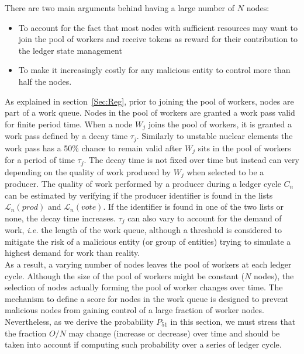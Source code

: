 There are two main arguments behind having a large number of $N$ nodes:

\begin{itemize}
 \item To account for the fact that most nodes with sufficient resources may want to join the pool of workers and receive tokens as reward for their contribution to the ledger state management
\item To make it increasingly costly for any malicious entity to control more than half the nodes.
\end{itemize}

As explained in section~\ref{Sec:Reg}, prior to joining the pool of workers, nodes are part of a work queue. Nodes in the pool of workers are granted a work pass valid for finite period time. When a node $W_j$ joins the pool of workers, it is granted a work pass defined by a decay time $\tau_j$. Similarly to unstable nuclear elements the work pass has a 50\% chance to remain valid after $W_j$ sits in the pool of workers for a period of time $\tau_j$. The decay time is not fixed over time but instead can very depending on the quality of work produced by $W_j$ when selected to be a producer. The quality of work performed by a producer during a ledger cycle $C_n$ can be estimated by verifying if the producer identifier is found in the lists $\mathcal{L}_n(prod)$ and $\mathcal{L}_n(vote)$. If the identifier is found in one of the two lists or none, the decay time increases. 
$\tau_j$ can also vary to account for the demand of work, \textit{i.e.} the length of the work queue, although a threshold is considered to mitigate the risk of a malicious entity (or group of entities) trying to simulate a highest demand for work than reality.\\ 

As a result, a varying number of nodes leaves the pool of workers at each ledger cycle. Although the size of the pool of workers might be constant ($N$ nodes), the selection of nodes actually forming the pool of worker changes over time. The mechanism to define a score for nodes in the work queue is designed to prevent malicious nodes from gaining control of a large fraction of worker nodes. Nevertheless, as we derive the probability $P_{51}$ in this section, we must stress that the fraction $O/N$ may change (increase or decrease) over time and should be taken into account if computing such probability over a series of ledger cycle.\\

